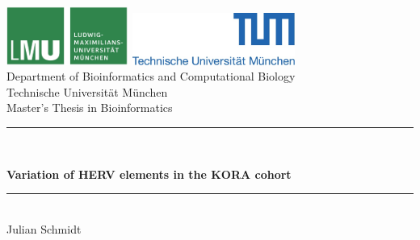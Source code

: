 \documentclass[a4paper,12pt,twoside,openright]{article}
\newcommand{\HRule}{\rule{\linewidth}{0.5mm}}
\begin{document}
\sloppy
\sectionfont{\LARGE}
\subsectionfont{\Large}
\subsubsectionfont{\Large}
\subsubsectionfont{\Large}

\begin{titlepage}


\sffamily

\begin{center}


\includegraphics[width=0.3\textwidth]{../figures/LMU-logo.jpg}
\hfill
\includegraphics[width=0.4\textwidth]{../figures/TUM-logo.jpg}  
\\[5cm]

{\LARGE Department of Bioinformatics and Computational Biology}\\[0.5cm]
{Technische Universit\"at M\"unchen}\\
[2cm]
{\Large Master's Thesis in Bioinformatics}\\[1.5cm]

\HRule \\[0.4cm]
\begin{spacing}{1.6}
{\huge \bfseries Variation of HERV elements in the KORA cohort
}
\end{spacing}
\HRule \\[1.5cm]

{\Large Julian Schmidt}\\[2.5cm]

\vfill
\end{center}
\end{titlepage}
\pagestyle{empty}
\end{document}
